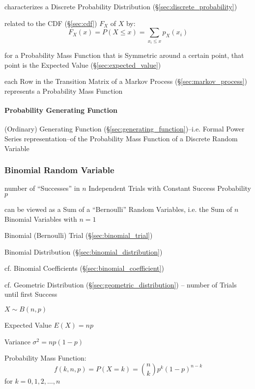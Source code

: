 characterizes a Discrete Probability Distribution
(\S\ref{sec:discrete_probability})

related to the CDF (\S\ref{sec:cdf}) $F_X$ of $X$ by:
\[
  F_X(x) = P(X \leq x) = \sum_{x_i \leq x} p_X(x_i)
\]

for a Probability Mass Function that is Symmetric around a certain point, that
point is the Expected Value (\S\ref{sec:expected_value})

\fist each Row in the Transition Matrix of a Markov Process
(\S\ref{sec:markov_process}) represents a Probability Mass Function



\paragraph{Probability Generating Function}
\label{sec:probability_generating_function}\hfill

(Ordinary) Generating Function (\S\ref{sec:generating_function})--i.e. Formal
Power Series representation--of the Probability Mass Function of a Discrete
Random Variable



\subsubsection{Binomial Random Variable}\label{sec:binomial_variable}

number of ``Successes'' in $n$ Independent Trials with Constant Success
Probability $p$

can be viewed as a Sum of a ``Bernoulli'' Random Variables, i.e. the Sum of $n$
Binomial Variables with $n = 1$

Binomial (Bernoulli) Trial (\S\ref{sec:binomial_trial})

Binomial Distribution (\S\ref{sec:binomial_distribution})

cf. Binomial Coefficients (\S\ref{sec:binomial_coefficient})

\fist cf. Geometric Distribution (\S\ref{sec:geometric_distribution}) -- number
of Trials until first Success

$X \sim B(n,p)$

Expected Value $E(X) = np$

Variance $\sigma^2 = np(1-p)$

Probability Mass Function:
\[
  f(k,n,p) = P(X = k) = \binom{n}{k} p^k (1-p)^{n-k}
\]
for $k = 0,1,2, \ldots, n$



